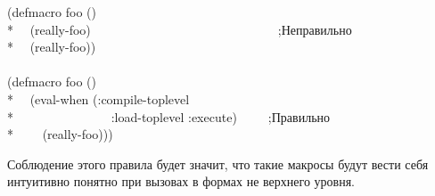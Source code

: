 \begin{defspec}
\begin{itemize}
  \begin{lisp}
    (defmacro foo () \\*
    ~~(really-foo)~~~~~~~~~~~~~~~~~~~~~~~~~~~~~~;\textrm{Неправильно}\\*
    ~~{\Xbq}(really-foo)) \\
    \\
    (defmacro foo () \\*
    ~~{\Xbq}(eval-when (:compile-toplevel \\*
    ~~~~~~~~~~~~~~~:load-toplevel :execute)~~~~~;\textrm{Правильно} \\*
    ~~~~(really-foo)))
  \end{lisp}
  Соблюдение этого правила будет значит, что такие макросы будут вести себя
  интуитивно понятно при вызовах в формах не верхнего уровня.


\end{itemize}
\end{defspec}
